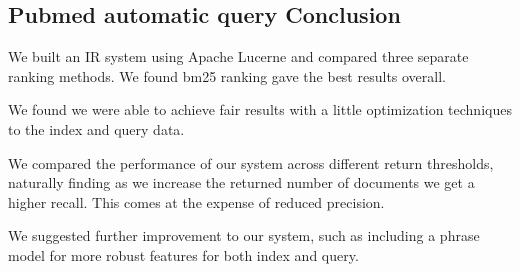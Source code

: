 \subsection{Pubmed automatic query Conclusion}


We built an IR system using Apache Lucerne and compared three separate ranking methods. We found bm25 ranking gave the best results overall.

We found we were able to achieve fair results with a little optimization techniques to the index and query data.

We compared the performance of our system across different return thresholds, naturally finding as we increase the returned number of documents we get a higher recall. This comes at the expense of reduced precision.

We suggested further improvement to our system, such as including a phrase model for more robust features for both index and query.



